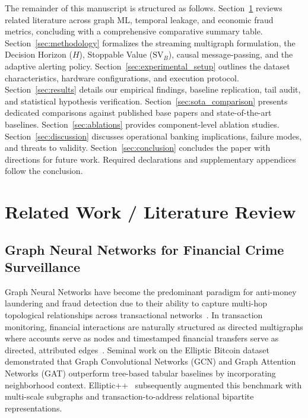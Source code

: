 \documentclass[pdflatex,sn-mathphys,Numbered]{sn-jnl}
\theoremstyle{thmstyleone}
\theoremstyle{thmstyletwo}
\theoremstyle{thmstylethree}
\begin{document}
The remainder of this manuscript is structured as follows. Section~\ref{sec:related_work} reviews related literature across graph ML, temporal leakage, and economic fraud metrics, concluding with a comprehensive comparative summary table. Section~\ref{sec:methodology} formalizes the streaming multigraph formulation, the Decision Horizon ($H$), Stoppable Value ($\text{SV}_B$), causal message-passing, and the adaptive alerting policy. Section~\ref{sec:experimental_setup} outlines the dataset characteristics, hardware configurations, and execution protocol. Section~\ref{sec:results} details our empirical findings, baseline replication, tail audit, and statistical hypothesis verification. Section~\ref{sec:sota_comparison} presents dedicated comparisons against published base papers and state-of-the-art baselines. Section~\ref{sec:ablations} provides component-level ablation studies. Section~\ref{sec:discussion} discusses operational banking implications, failure modes, and threats to validity. Section~\ref{sec:conclusion} concludes the paper with directions for future work. Required declarations and supplementary appendices follow the conclusion.

\section{Related Work / Literature Review}
\label{sec:related_work}

\subsection{Graph Neural Networks for Financial Crime Surveillance}
Graph Neural Networks have become the predominant paradigm for anti-money laundering and fraud detection due to their ability to capture multi-hop topological relationships across transactional networks~\cite{kipf2017gcn,hamilton2017sage,velickovic2018gat,xu2018jk}. In transaction monitoring, financial interactions are naturally structured as directed multigraphs where accounts serve as nodes and timestamped financial transfers serve as directed, attributed edges~\cite{altman2023ibmaml,egressy2024multigraph}. Seminal work on the Elliptic Bitcoin dataset~\cite{weber2019elliptic} demonstrated that Graph Convolutional Networks (GCN) and Graph Attention Networks (GAT) outperform tree-based tabular baselines by incorporating neighborhood context. Elliptic++~\cite{elmougy2023ellipticpp} subsequently augmented this benchmark with multi-scale subgraphs and transaction-to-address relational bipartite representations.
\end{document}
